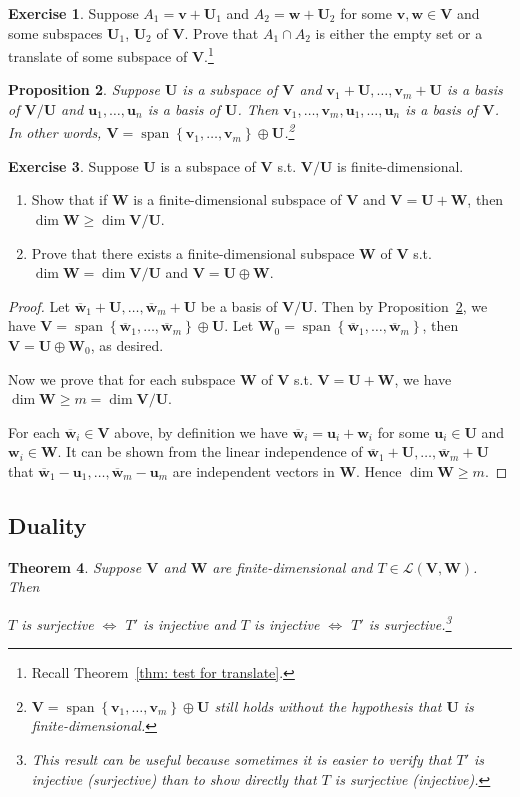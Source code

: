 \documentclass{tufte-handout}
\def \v {\vspace{0.2cm}}
\theoremstyle{plain} %
\newtheorem{thm}{Theorem}
\newtheorem{prop}[thm]{Proposition}
\theoremstyle{definition}
\newtheorem{exer}[thm]{Exercise}
\theoremstyle{remark}
\newcommand{\bra}[1]{\mathopen{}\left(#1\right)}
\newcommand{\cbra}[1]{\mathopen{}\left\{#1\right\}}
\newcommand{\mL}{\mathcal{L}}
\newcommand{\U}{\bm{U}}
\newcommand{\V}{\bm{V}}
\newcommand{\W}{\bm{W}}
\renewcommand{\u}{\bm{u}}
\renewcommand{\v}{\bm{v}}
\newcommand{\w}{\bm{w}}
\DeclareMathOperator{\spn}{span}
\begin{document}
\begin{exer}
	Suppose $A_1=\v+\U_1$ and $A_2=\w+\U_2$ for some $\v,\w\in\V$ and some subspaces $\U_1$, $\U_2$ of $\V$. Prove that $A_1\cap A_2$ is either the empty set or a translate of some subspace of $\V$.\footnote{Recall Theorem~\ref{thm: test for translate}.}
\end{exer}

\begin{prop}\label{prop: direct sum from quotient space}
	Suppose $\U$ is a subspace of $\V$ and $\v_1+\U,\dots,\v_m+\U$ is a basis of $\V/\U$ and $\u_1,\dots,\u_n$ is a basis of $\U$. Then $\v_1,\dots,\v_m,\u_1,\dots,\u_n$ is a basis of $\V$. In other words, $\V=\spn\cbra{\v_1,\dots,\v_m}\oplus\U$.\footnote{$\V=\spn\cbra{\v_1,\dots,\v_m}\oplus\U$ still holds without the hypothesis that $\U$ is finite-dimensional.}
\end{prop}

\begin{exer}
	Suppose $\U$ is a subspace of $\V$ s.t. $\V/\U$ is finite-dimensional.
	\begin{enumerate}
		\item Show that if $\W$ is a finite-dimensional subspace of $\V$ and $\V=\U+\W$, then $\dim\W\geq\dim\V/\U$.
		\item Prove that there exists a finite-dimensional subspace $\W$ of $\V$ s.t. $\dim\W=\dim\V/\U$ and $\V=\U\oplus\W$.
	\end{enumerate}
\end{exer}
\begin{proof}
	Let $\overline{\w}_1+\U,\dots,\overline{\w}_m+\U$ be a basis of $\V/\U$. Then by Proposition~\ref{prop: direct sum from quotient space}, we have $\V=\spn\cbra{\overline{\w}_1,\dots,\overline{\w}_m}\oplus\U$. Let $\W_0=\spn\cbra{\overline{\w}_1,\dots,\overline{\w}_m}$, then $\V=\U\oplus\W_0$, as desired.

	Now we prove that for each subspace $\W$ of $\V$ s.t. $\V=\U+\W$, we have $\dim\W\geq m=\dim\V/\U$.
	
	For each $\overline{\w}_i\in\V$ above, by definition we have $\overline{\w}_i=\u_i+\w_i$ for some $\u_i\in\U$ and $\w_i\in\W$. It can be shown from the linear independence of $\overline{\w}_1+\U,\dots,\overline{\w}_m+\U$ that $\overline{\w}_1-\u_1,\dots,\overline{\w}_m-\u_m$ are independent vectors in $\W$. Hence $\dim\W\geq m$.
\end{proof}


\subsection{Duality}
\begin{thm}
	Suppose $\V$ and $\W$ are finite-dimensional and $T\in\mL\bra{\V,\W}$. Then
	\begin{center}
	$T$ is surjective $\iff$ $T'$ is injective \quad and \quad $T$ is injective $\iff$ $T'$ is surjective.\footnote{This result can be useful because sometimes it is easier to verify that $T'$ is injective (surjective) than to show directly that $T$ is surjective (injective).}
	\end{center}
\end{thm}
\end{document}
